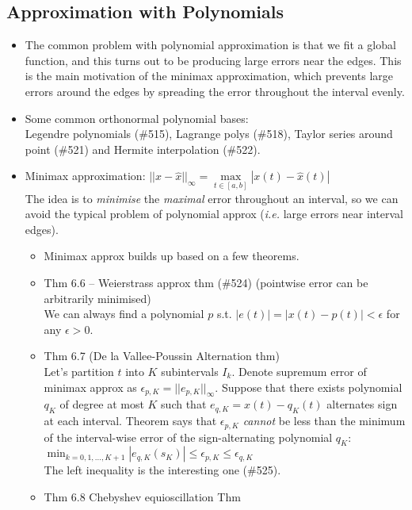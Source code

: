 \documentclass{article}
\newcommand{\ie}{\textit{i.e. }}
\newcommand{\cg}{\color{gray}}
\newcommand{\fs}{\footnotesize}
\begin{document}
\subsection*{Approximation with Polynomials}
\begin{itemize}
\item The common problem with polynomial approximation is that we fit a global function, and this turns out to be producing large errors near the edges. This is the main motivation of the minimax approximation, which prevents large errors around the edges by spreading the error throughout the interval evenly.
\setlength{\parindent}{0mm}
\item Some common orthonormal polynomial bases:\\
{\cg\fs
Legendre polynomials (\#515), Lagrange polys (\#518), Taylor series around point (\#521) and Hermite interpolation (\#522).}
\item Minimax approximation: $||x-\hat{x}||_{\infty}=\max\limits_{t\in[a,b]}|x(t)-\hat{x}(t)|$ \\
{\cg The idea is to \textit{minimise} the \textit{maximal} error throughout an interval, so we can avoid the typical problem of polynomial approx (\ie large errors near interval edges). }
\begin{itemize}
	\item Minimax approx builds up based on a few theorems.
	\item Thm 6.6 -- Weierstrass approx thm (\#524) {\cg(pointwise error can be arbitrarily minimised)} \\
	{\cg We can always find a polynomial $p$ s.t. $|e(t)|=|x(t)-p(t)|<\epsilon$ for any $\epsilon>0$. }
	\item Thm 6.7 (De la Vallee-Poussin Alternation thm)\\
	{\cg Let's partition $t$ into $K$ subintervals $I_k$. Denote supremum error of minimax approx as $\epsilon_{p,K}=||e_{p,K}||_\infty$. Suppose that there exists polynomial $q_{K}$ of degree at most $K$ such that $e_{q,K}=x(t)-q_K(t)$ alternates sign at each interval. 
	Theorem says that $\epsilon_{p,K}$ \textit{cannot} be less than the minimum of the interval-wise error of the sign-alternating polynomial $q_K$:\\
	$\min_{k=0,1,...,K+1}|e_{q,K}(s_K)|\leq \epsilon_{p,K}\leq \epsilon_{q,K}$
	\\ The left inequality is the interesting one (\#525).
	}
	\item Thm 6.8 Chebyshev equioscillation Thm
\end{itemize}
\end{itemize}
\end{document}
